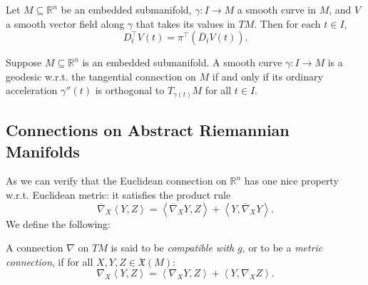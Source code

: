 \begin{proposition}
  \label{proposition-covariant-derivatives-relationship}
  Let \( M \subseteq \mathbb{R}^n \) be an embedded submanifold, \( \gamma: I \to M \) a smooth curve in \( M \), and \( V \) a smooth vector field along \( \gamma \) that takes its values in \( TM \).
  Then for each \( t \in I \),
  \[
    D^{\top}_t V(t) = \pi^{\top}(\overline{D}_t V(t)).
  \]
\end{proposition}

\begin{corollary}
  \label{corollary-covariant-derivatives-relationship}
  Suppose \( M \subseteq \mathbb{R}^n \) is an embedded submanifold.
  A smooth curve \( \gamma: I \to M \) is a geodesic w.r.t. the tangential connection on \( M \) if and only if its ordinary acceleration \( \gamma''(t) \) is orthogonal to \( T_{\gamma(t)} M \) for all \( t \in I \).
\end{corollary}

\subsection{Connections on Abstract Riemannian Manifolds}
\label{subsection-connections-on-abstract-riemannian-manifolds}

As we can verify that the Euclidean connection on \( \mathbb{R}^n \) has one nice property w.r.t. Euclidean metric: it satisfies the product rule
\[
  \overline{\nabla}_X \left\langle Y, Z \right\rangle = \left\langle \overline{\nabla}_X Y, Z \right\rangle + \left\langle Y, \overline{\nabla}_X Y \right\rangle.
\]
We define the following:

\begin{definition}
  \label{definition-compatible}
  \label{definition-metric-connection}
  A connection \( \nabla \) on \( TM \) is said to be \emph{compatible with} \( g \), or to be a \emph{metric connection}, if for all \( X, Y, Z \in \mathfrak{X}(M) \):
  \[
    \nabla_X \left\langle Y, Z \right\rangle = \left\langle \nabla_X Y , Z \right\rangle + \left\langle Y, \nabla_X Z \right\rangle.
  \]
\end{definition}

